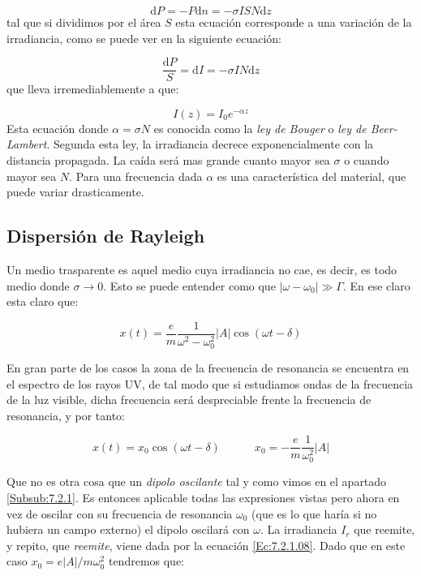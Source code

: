 \documentclass[12pt,a4paper]{article}
\newcommand{\D}{\mathrm{d}}
\newcommand{\tquad}{\quad \quad \quad}
\numberwithin{equation}{section}
\numberwithin{figure}{section}
\begin{document}
\begin{equation}
\D P = - P \D n = - \sigma I S N \D z
\end{equation}
tal que si dividimos por el área $S$ esta ecuación corresponde a una variación de la irradiancia, como se puede ver en la siguiente ecuación:

\begin{equation}
\dfrac{\D P}{S} = \D I = - \sigma I N \D z
\end{equation}
que lleva irremediablemente a que:

\begin{equation}
I(z)=I_0 e^{-\alpha z}
\end{equation}
Esta ecuación donde $\alpha=\sigma N$ es conocida como la \textit{ley de Bouger} o \textit{ley de Beer-Lambert}. Segunda esta ley, la irradiancia decrece exponencialmente con la distancia propagada. La caída será mas grande cuanto mayor sea $\sigma$ o cuando mayor sea $N$. Para una frecuencia dada $\alpha$ es una característica del material, que puede variar drasticamente. 

\subsection{Dispersión de Rayleigh}

Un medio trasparente es aquel medio cuya irradiancia no cae, es decir, es todo medio donde $\sigma \rightarrow 0$. Esto se puede entender como que $|\omega  - \omega_0| \gg \Gamma$. En ese claro esta claro que:

\begin{equation}
x(t) = \dfrac{e}{m} \dfrac{1}{\omega^2 - \omega_0^2} |A| \cos (\omega t - \delta)
\end{equation}

En gran parte de los casos la zona de la frecuencia de resonancia se encuentra en el espectro de los rayos UV, de tal modo que si estudiamos ondas de la frecuencia de la luz visible, dicha frecuencia será despreciable frente la frecuencia de resonancia, y por tanto:

\begin{equation}
x(t) = x_0 \cos(\omega t - \delta) \tquad x_0 = - \dfrac{e}{m} \dfrac{1}{\omega_0^2} |A|
\end{equation}

Que no es otra cosa que un \textit{dipolo oscilante} tal y como vimos en el apartado  \ref{Subsub:7.2.1}. Es entonces aplicable todas las expresiones vistas pero ahora en vez de oscilar con su frecuencia de resonancia $\omega_0$ (que es lo que haría si no hubiera un campo externo) el dipolo oscilará con $\omega$. La irradiancia $I_r$ que reemite, y repito, que \textit{reemite}, viene dada por la ecuación \ref{Ec:7.2.1.08}. Dado que en este caso $x_0 = e |A| /m \omega_0^2$ tendremos que:
\end{document}
